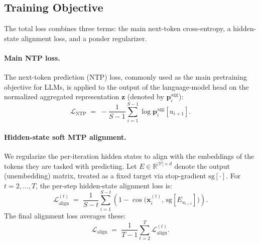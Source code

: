 \subsection{Training Objective}
\label{sec:method:loss}

The total loss combines three terms: the main next-token cross-entropy, a hidden-state alignment loss, and a
ponder regularizer.

\paragraph{Main NTP loss.} The next-token prediction (NTP) loss, commonly used as the main pretraining objective for LLMs, is applied to the output of the language-model head on the normalized aggregated representation $\mathbf{z}$ (denoted by $\mathbf{p}_i^{\text{agg}}$):
\begin{equation}
  \mathcal{L}_{\text{NTP}} \;=\; -\frac{1}{S-1}\sum_{i=1}^{S-1} \log \mathbf{p}_i^{\text{agg}}\!\left[u_{i+1}\right].
\end{equation}


\paragraph{Hidden-state soft MTP alignment.}
We regularize the per-iteration hidden states to align with the embeddings of the tokens they are tasked with predicting. Let $E \in \mathbb{R}^{|\mathcal{V}| \times d}$ denote the output (unembedding) matrix, treated as a fixed target via stop-gradient $\mathrm{sg}[\cdot]$. For $t = 2, \dots, T$, the per-step hidden-state alignment loss is:
\begin{equation}
  \mathcal{L}^{(t)}_{\text{align}} \;=\; \frac{1}{S - t}\sum_{i=1}^{S - t}\!\left(1 - \cos\!\big(\mathbf{x}^{(t)}_{i},\, \mathrm{sg}[E_{u_{i+t}}]\big)\right).
\end{equation}
The final alignment loss averages these:
\begin{equation}
  \mathcal{L}_{\text{align}} \;=\; \frac{1}{T-1}\sum_{t=2}^{T}\mathcal{L}^{(t)}_{\text{align}}.
\end{equation}


